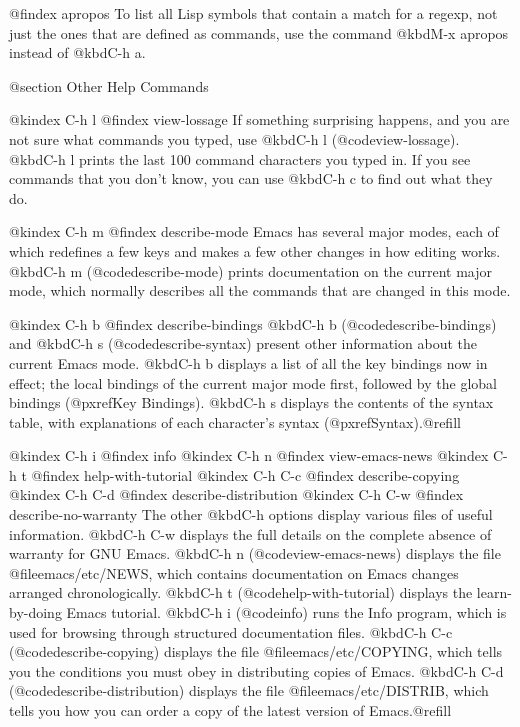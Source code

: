 {{{{{@findex apropos
  To list all Lisp symbols that contain a match for a regexp, not just
the ones that are defined as commands, use the command @kbd{M-x apropos}
instead of @kbd{C-h a}.

@section Other Help Commands

@kindex C-h l
@findex view-lossage
  If something surprising happens, and you are not sure what commands you
typed, use @kbd{C-h l} (@code{view-lossage}).  @kbd{C-h l} prints the last
100 command characters you typed in.  If you see commands that you don't
know, you can use @kbd{C-h c} to find out what they do.

@kindex C-h m
@findex describe-mode
  Emacs has several major modes, each of which redefines a few keys and
makes a few other changes in how editing works.  @kbd{C-h m} (@code{describe-mode})
prints documentation on the current major mode, which normally describes
all the commands that are changed in this mode.

@kindex C-h b
@findex describe-bindings
  @kbd{C-h b} (@code{describe-bindings}) and @kbd{C-h s}
(@code{describe-syntax}) present other information about the current
Emacs mode.  @kbd{C-h b} displays a list of all the key bindings now
in effect; the local bindings of the current major mode first,
followed by the global bindings (@pxref{Key Bindings}).  @kbd{C-h s}
displays the contents of the syntax table, with explanations of each
character's syntax (@pxref{Syntax}).@refill

@kindex C-h i
@findex info
@kindex C-h n
@findex view-emacs-news
@kindex C-h t
@findex help-with-tutorial
@kindex C-h C-c
@findex describe-copying
@kindex C-h C-d
@findex describe-distribution
@kindex C-h C-w
@findex describe-no-warranty
  The other @kbd{C-h} options display various files of useful information.
@kbd{C-h C-w} displays the full details on the complete absence of warranty
for GNU Emacs.  @kbd{C-h n} (@code{view-emacs-news}) displays the file
@file{emacs/etc/NEWS}, which contains documentation on Emacs changes
arranged chronologically.  @kbd{C-h t} (@code{help-with-tutorial}) displays
the learn-by-doing Emacs tutorial.  @kbd{C-h i} (@code{info}) runs the Info
program, which is used for browsing through structured documentation files.
@kbd{C-h C-c} (@code{describe-copying}) displays the file
@file{emacs/etc/COPYING}, which tells you the conditions you must obey in
distributing copies of Emacs.  @kbd{C-h C-d} (@code{describe-distribution})
displays the file @file{emacs/etc/DISTRIB}, which tells you how you can
order a copy of the latest version of Emacs.@refill

}}}}}
